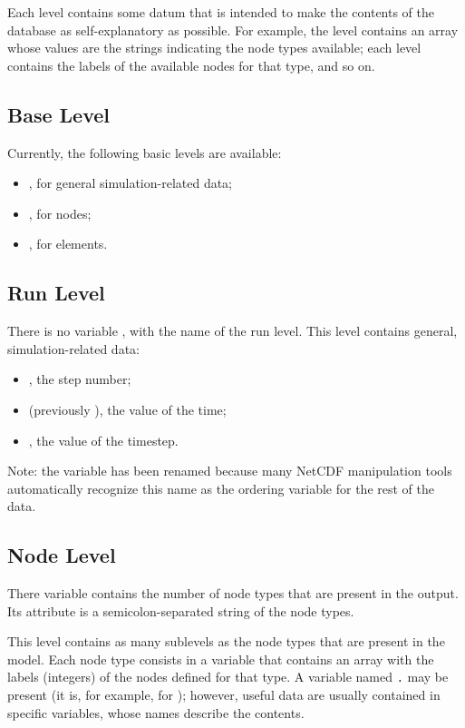 Each level contains some datum that is intended to make the contents
of the database as self-explanatory as possible.
For example, the level  contains an array whose values
are the strings indicating the node types available;
each level  contains the labels of the available nodes
for that type, and so on.



\subsection{Base Level}
Currently, the following basic levels are available:
\begin{itemize}
\item {}, for general simulation-related data;
\item {}, for nodes;
\item {}, for elements.
\end{itemize}



\subsection{Run Level}
There is no variable , with the name of the run level.
This level contains general, simulation-related data:
\begin{itemize}
\item {}, the step number;
\item {} (previously ), the value of the time;
\item {}, the value of the timestep.
\end{itemize}
Note: the  variable has been renamed 
because many NetCDF manipulation tools automatically recognize
this name as the ordering variable for the rest of the data.



\subsection{Node Level}
There variable  contains the number of node types that are present in the output.
Its attribute  is a semicolon-separated string of the node types.

This level contains as many sublevels as the node types
that are present in the model.
Each node type consists in a variable that contains an array
with the labels (integers) of the nodes defined for that type.
A variable named \texttt{.} may be present
(it is, for example, for ); however, useful data are usually
contained in specific variables, whose names describe the contents.

